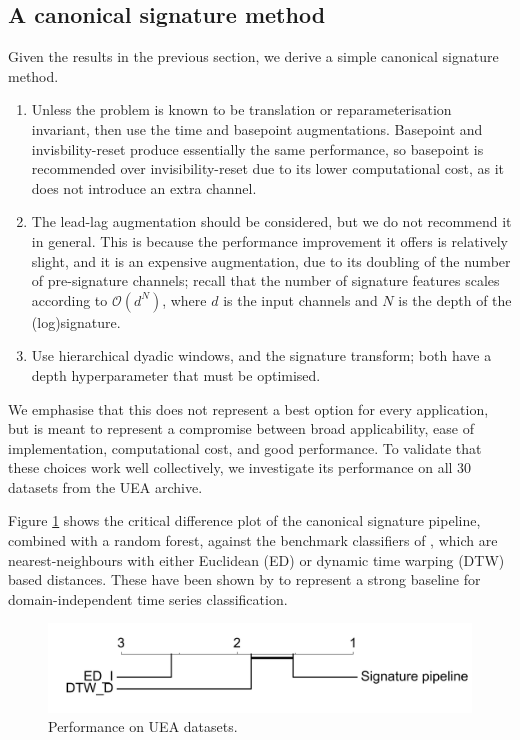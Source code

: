 \documentclass{article}
\theoremstyle{definition}
\theoremstyle{remark}
\newcommand{\bigO}{\mathcal{O}}
\begin{document}
	\subsection{A canonical signature method}
	\label{sec:performance}

	Given the results in the previous section, we derive a simple canonical signature method.
	\begin{enumerate}
		\item Unless the problem is known to be translation or reparameterisation invariant, then use the time and basepoint augmentations. Basepoint and invisbility-reset produce essentially the same performance, so basepoint is recommended over invisibility-reset due to its lower computational cost, as it does not introduce an extra channel.
		\item The lead-lag augmentation should be considered, but we do not recommend it in general. This is because the performance improvement it offers is relatively slight, and it is an expensive augmentation, due to its doubling of the number of pre-signature channels; recall that the number of signature features scales according to $\bigO(d^N)$, where $d$ is the input channels and $N$ is the depth of the (log)signature.
		\item Use hierarchical dyadic windows, and the signature transform; both have a depth hyperparameter that must be optimised.
	\end{enumerate}
	We emphasise that this does not represent a best option for every application, but is meant to represent a compromise between broad applicability, ease of implementation, computational cost, and good performance. To validate that these choices work well collectively, we investigate its performance on all 30 datasets from the UEA archive.

	Figure \ref{fig:best_rf} shows the critical difference plot of the canonical signature pipeline, combined with a random forest, against the benchmark classifiers of \citet{bagnall2018uea}, which are nearest-neighbours with either Euclidean (ED) or dynamic time warping (DTW) based distances. These have been shown by \citet{bagnall2017great} to represent a strong baseline for domain-independent time series classification.
	
	\begin{figure}[h]
  		\centering
	  	\vspace{-1em}
  		\includegraphics[width=.45\linewidth]{images/bestsig_wilcoxon.png}
  		\caption{Performance on UEA datasets.}
  		\label{fig:best_rf}
	\end{figure}
	
\end{document}
